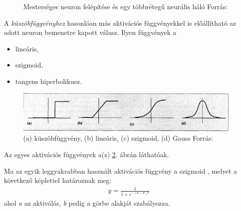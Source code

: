 \documentclass[12pt,a4]{article}
\begin{document}
	
	\begin{figure}[h]%
		\centering
		\qquad
		\caption{Mesterséges neuron felépítése és egy többrétegű neurális háló \newline\centering Forrás: \cite{ann}}%
		\label{fig:fig2}%
	\end{figure}
	\newpage
	A \textit{küszöbfüggvényhez} hasonlóan más aktivációs függvényekkel is előállítható az adott neuron bemenetre kapott válasz. Ilyen függvények a 
	\begin{itemize}
		\item lineáris,
		\item szigmoid,
		\item tangens hiperbolikusz.
	\end{itemize}

	\begin{figure}[h]	
		\centering
		\includegraphics[width=1\linewidth]{fuggvenyek}
		\caption{(a) küszöbfüggvény, (b) lineáris, (c) szigmoid, (d) Gauss 
			\newline\centering Forrás: \cite{ann2}}
		\label{fuggvenyek}
	\end{figure}
    Az egyes aktivációs függvények a(z) \ref{fuggvenyek}. ábrán láthatóak.
 
	\clearpage
	\begin{mdframed}
	Ma az egyik leggyakrabban használt aktivációs függvény a szigmoid \cite{ann4}, melyet a következő képlettel határoznak meg:
	\begin{align}
		&y = \frac{1}{1 + e^{-(a - \theta)b}}
	\end{align}
	ahol \textit{a} az aktiválás, \textit{b} pedig a görbe alakját szabályozza.
	\end{mdframed}
	
\end{document}

